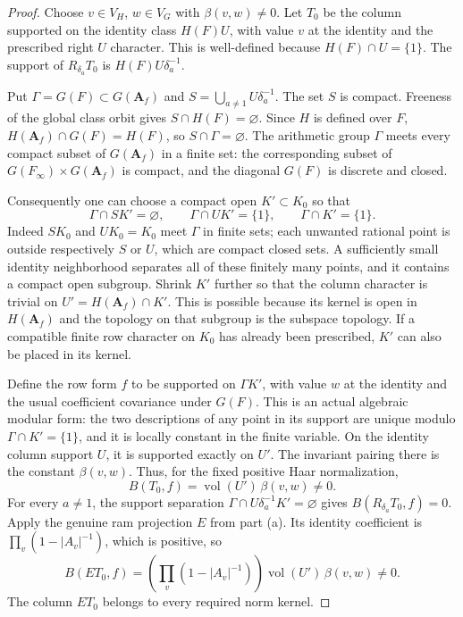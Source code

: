 \documentclass[11pt,a4paper]{article}
\theoremstyle{definition}
\theoremstyle{remark}
\begin{document}
\begin{proof}
Choose $v\in V_H$, $w\in V_G$ with $\beta(v,w)\ne0$.
Let $T_0$ be the column supported on the identity class
$H(F)U$, with value $v$ at the identity and the prescribed right
$U$ character.  This is well-defined because $H(F)\cap U=\{1\}$.
The support of $R_{\delta_a}T_0$ is
$H(F)U\delta_a^{-1}$.

Put $\Gamma=G(F)\subset G(\mathbf A_f)$ and
$S=\bigcup_{a\ne1}U\delta_a^{-1}$.
The set $S$ is compact.  Freeness of the global class orbit gives
$S\cap H(F)=\varnothing$.  Since $H$ is defined over $F$,
$H(\mathbf A_f)\cap G(F)=H(F)$, so $S\cap\Gamma=\varnothing$.
The arithmetic group $\Gamma$ meets every compact subset of
$G(\mathbf A_f)$ in a finite set: the corresponding subset of
$G(F_\infty)\times G(\mathbf A_f)$ is compact, and the diagonal
$G(F)$ is discrete and closed.

Consequently one can choose a compact open $K'\subset K_0$ so that
\[
 \Gamma\cap SK'=\varnothing,
 \qquad \Gamma\cap UK'=\{1\},
 \qquad \Gamma\cap K'=\{1\}.
\]
Indeed $SK_0$ and $UK_0=K_0$ meet $\Gamma$ in finite sets;
each unwanted rational point is outside respectively $S$ or $U$,
which are compact closed sets.  A sufficiently small identity
neighborhood separates all of these finitely many points, and it
contains a compact open subgroup.  Shrink $K'$ further so that
the column character is trivial on
$U'=H(\mathbf A_f)\cap K'$.  This is possible because its kernel
is open in $H(\mathbf A_f)$ and the topology on that subgroup is
the subspace topology.  If a compatible finite row character on
$K_0$ has already been prescribed, $K'$ can also be placed in its
kernel.

Define the row form $f$ to be supported on $\Gamma K'$, with value
$w$ at the identity and the usual coefficient covariance under
$G(F)$.  This is an actual algebraic modular form: the two
descriptions of any point in its support are unique modulo
$\Gamma\cap K'=\{1\}$, and it is locally constant in the finite
variable.  On the identity column support $U$, it is supported
exactly on $U'$.  The invariant pairing there is the constant
$\beta(v,w)$.  Thus, for the fixed positive Haar normalization,
\[
 B(T_0,f)=\operatorname{vol}(U')\,\beta(v,w)\ne0.
\]
For every $a\ne1$, the support separation
$\Gamma\cap U\delta_a^{-1}K'=\varnothing$ gives
$B(R_{\delta_a}T_0,f)=0$.
Apply the genuine ram projection $E$ from part (a).  Its identity
coefficient is $\prod_v(1-|A_v|^{-1})$, which is positive, so
\[
 B(ET_0,f)=
 \left(\prod_v(1-|A_v|^{-1})\right)
 \operatorname{vol}(U')\,\beta(v,w)\ne0.
\]
The column $ET_0$ belongs to every required norm kernel.
\end{proof}
\end{document}

